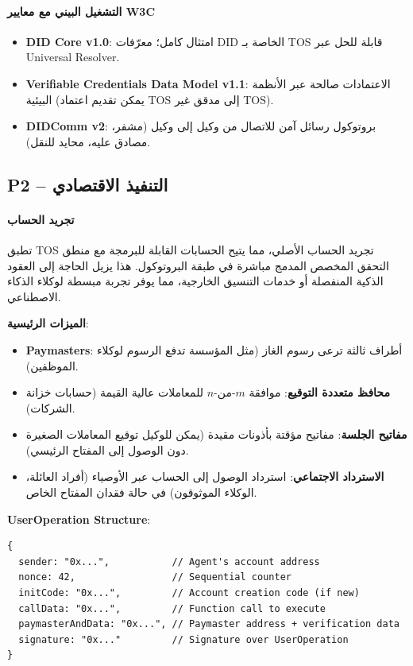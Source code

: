 \documentclass[11pt]{article}
\begin{document}
\paragraph{التشغيل البيني مع معايير W3C}
\begin{itemize}[noitemsep]
  \item \textbf{DID Core v1.0}: امتثال كامل؛ معرّفات DID الخاصة بـ TOS قابلة للحل عبر Universal Resolver.
  \item \textbf{Verifiable Credentials Data Model v1.1}: الاعتمادات صالحة عبر الأنظمة البيئية (يمكن تقديم اعتماد TOS إلى مدقق غير TOS).
  \item \textbf{DIDComm v2}: بروتوكول رسائل آمن للاتصال من وكيل إلى وكيل (مشفر، مصادق عليه، محايد للنقل).
\end{itemize}

\subsection{P2 -- التنفيذ الاقتصادي}
\label{sec:pillar-economic}

\paragraph{تجريد الحساب}
تطبق TOS تجريد الحساب الأصلي، مما يتيح الحسابات القابلة للبرمجة مع منطق التحقق المخصص المدمج مباشرة في طبقة البروتوكول. هذا يزيل الحاجة إلى العقود الذكية المنفصلة أو خدمات التنسيق الخارجية، مما يوفر تجربة مبسطة لوكلاء الذكاء الاصطناعي.

\textbf{الميزات الرئيسية}:
\begin{itemize}[noitemsep]
  \item \textbf{Paymasters}: أطراف ثالثة ترعى رسوم الغاز (مثل المؤسسة تدفع الرسوم لوكلاء الموظفين).
  \item \textbf{محافظ متعددة التوقيع}: موافقة $m$-من-$n$ للمعاملات عالية القيمة (حسابات خزانة الشركات).
  \item \textbf{مفاتيح الجلسة}: مفاتيح مؤقتة بأذونات مقيدة (يمكن للوكيل توقيع المعاملات الصغيرة دون الوصول إلى المفتاح الرئيسي).
  \item \textbf{الاسترداد الاجتماعي}: استرداد الوصول إلى الحساب عبر الأوصياء (أفراد العائلة، الوكلاء الموثوقون) في حالة فقدان المفتاح الخاص.
\end{itemize}

\textbf{UserOperation Structure}:
\begin{verbatim}
{
  sender: "0x...",           // Agent's account address
  nonce: 42,                 // Sequential counter
  initCode: "0x...",         // Account creation code (if new)
  callData: "0x...",         // Function call to execute
  paymasterAndData: "0x...", // Paymaster address + verification data
  signature: "0x..."         // Signature over UserOperation
}
\end{verbatim}
\end{document}
